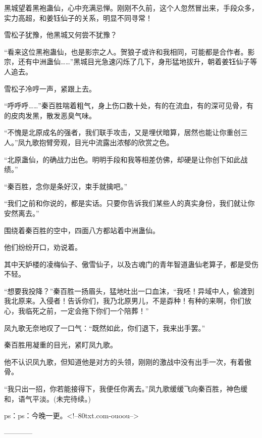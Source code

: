 \begin{this_body}
黑城望着黑袍蛊仙，心中充满忌惮。刚刚不久前，这个人忽然冒出来，手段众多，实力高超，和姜钰仙子的关系，明显不同寻常！

雪松子犹豫，他黑城又何尝不犹豫？

“看来这位黑袍蛊仙，也是影宗之人。贺狼子或许和我相同，可能都是合作者。影宗，还有中洲蛊仙……”黑城目光急速闪烁了几下，身形猛地拔升，朝着姜钰仙子等人追去。

雪松子冷哼一声，紧跟上去。

“呼呼呼……”秦百胜喘着粗气，身上伤口数十处，有的在流血，有的深可见骨，有的皮肉发黑，散发恶臭气味。

“不愧是北原成名的强者，我们联手攻击，又是埋伏暗算，居然也能让你重创三人。”凤九歌抱臂旁观，目光中流露出浓郁的欣赏之色。

“北原蛊仙，的确战力出色。明明手段和我等相差仿佛，却硬是让你创下如此战绩。”

“秦百胜，念你是条好汉，束手就擒吧。”

“我们之前和你说的，都是实话。只要你告诉我们某些人的真实身份，我们就让你安然离去。”

围绕着秦百胜的空中，四面八方都站着中洲蛊仙。

他们纷纷开口，劝说着。

其中天妒楼的凌梅仙子、傲雪仙子，以及古魂门的青年智道蛊仙老算子，都是受伤不轻。

“想要我投降？”秦百胜一扬眉头，猛地吐出一口血沫，“我呸！异域中人，偷渡到我北原来。入侵者！告诉你们，我乃北原男儿，不是孬种！有种的来啊，你们放心，我临死之前，一定会拖下你们一个陪葬！”

凤九歌无奈地叹了一口气：“既然如此，你们退下，我来出手罢。”

秦百胜用凝重的目光，紧盯凤九歌。

他不认识凤九歌，但知道他是对方的头领，刚刚的激战中没有出手一次，有着傲骨。

“我只出一招，你若能接得下，我便任你离去。”凤九歌缓缓飞向秦百胜，神色缓和，语气平淡。(未完待续。)

ps：ps：今晚一更。<!--80txt.com-ouoou-->

------------

\end{this_body}

